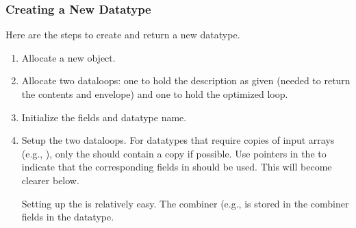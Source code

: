 \documentclass{article}
\begin{document}
\subsubsection{Creating a New Datatype}
Here are the steps to create and return a new datatype.
\begin{enumerate}
\item Allocate a new object.
\item Allocate two dataloops: one to hold the description as given (needed to
  return the contents and envelope) and one to hold the optimized loop.
\item Initialize the fields and datatype name.
\item Setup the two dataloops.  For datatypes that require copies of input
  arrays (e.g., ), only the
   should contain a copy if possible.  
  Use  pointers in the  to indicate
  that the corresponding fields in  should
  be used.  This will become clearer below.
  
  Setting up the  is relatively easy.  The combiner (e.g.,
   is stored in the combiner fields in the
  datatype.  


\end{enumerate}
\end{document}
